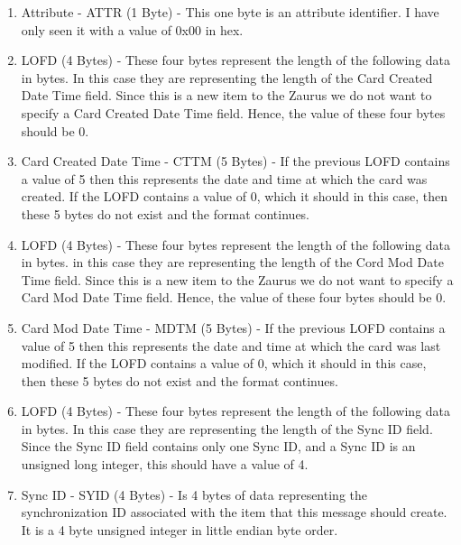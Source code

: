 \begin{enumerate}
            \item Attribute - ATTR (1 Byte) - This one byte is an attribute
              identifier. I have only seen it with a value of 0x00 in hex.

            \item LOFD (4 Bytes) - These four bytes represent the length of
              the following data in bytes. In this case they are representing
              the length of the Card Created Date Time field. Since this is a
              new item to the Zaurus we do not want to specify a Card Created
              Date Time field. Hence, the value of these four bytes should be
              0.

            \item Card Created Date Time - CTTM (5 Bytes) - If the previous
              LOFD contains a value of 5 then this represents the date and time
              at which the card was created. If the LOFD contains a value of 0,
              which it should in this case, then these 5 bytes do not exist and
              the format continues.

            \item LOFD (4 Bytes) - These four bytes represent the length of
              the following data in bytes. in this case they are representing
              the length of the Cord Mod Date Time field. Since this is a new
              item to the Zaurus we do not want to specify a Card Mod Date
              Time field. Hence, the value of these four bytes should be 0.

            \item Card Mod Date Time - MDTM (5 Bytes) - If the previous LOFD
              contains a value of 5 then this represents the date and time at
              which the card was last modified. If the LOFD contains a value
              of 0, which it should in this case, then these 5 bytes do not
              exist and the format continues.

            \item LOFD (4 Bytes) - These four bytes represent the length of
              the following data in bytes. In this case they are representing
              the length of the Sync ID field. Since the Sync ID field contains
              only one Sync ID, and a Sync ID is an unsigned long integer,
              this should have a value of 4.

            \item Sync ID - SYID (4 Bytes) - Is 4 bytes of data representing
              the synchronization ID associated with the item that this
              message should create. It is a 4 byte unsigned integer in little
              endian byte order.
            \end{enumerate}

